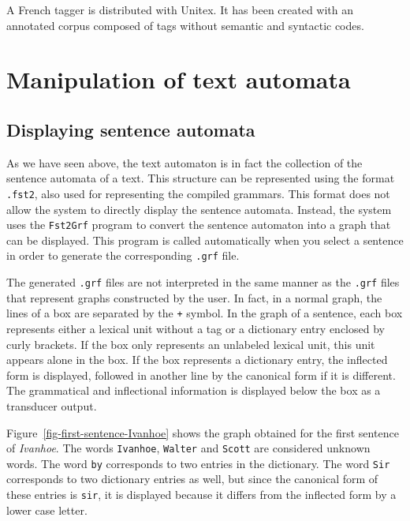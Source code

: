 \bigskip
\noindent A French tagger is distributed with Unitex. It has been created 
with an annotated corpus composed of tags without semantic and syntactic codes.



\section{Manipulation of text automata}

\subsection{Displaying sentence automata}
\label{section-displaying-sentence-automata}
As we have seen above, the text automaton is in fact the collection of the
sentence automata of a text. This structure can be represented using the format
\verb+.fst2+, also used for representing the compiled
grammars. This format does not allow the system to
directly display the sentence automata. Instead, the system uses the
\verb+Fst2Grf+ program to convert the sentence automaton into a graph that can
be displayed. This program is called automatically when you select a sentence  in
order to generate the corresponding \verb+.grf+ file.

\bigskip
\noindent The generated \verb+.grf+ files are not interpreted in the same manner
as the \verb+.grf+ files that represent graphs constructed by the user. In fact,
in a normal graph, the lines of a box are separated by the \verb$+$ symbol. In
the graph of a sentence, each box represents either a lexical unit without a tag
or a dictionary entry enclosed by curly brackets. If the box only represents an
unlabeled lexical unit, this unit appears alone in the box. If the box represents
a dictionary entry, the inflected form is displayed, followed in another line by
the canonical form if it is different. The grammatical and inflectional
information is  displayed below the box as a transducer output.


\bigskip
\noindent Figure~\ref{fig-first-sentence-Ivanhoe} shows
the graph obtained for the first sentence of \textit{Ivanhoe}. The words \verb+Ivanhoe+,
\verb+Walter+ and \verb+Scott+ are considered unknown words. The word \verb+by+
corresponds to two entries in the dictionary. The word \verb+Sir+ corresponds to
two dictionary entries as well, but since the canonical form of these entries is
\verb+sir+, it is displayed because it differs from the inflected form by a lower
case letter.

